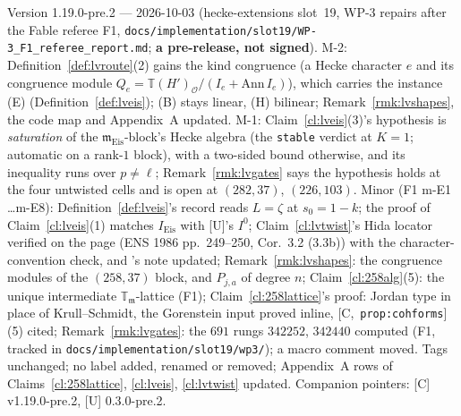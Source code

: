 \documentclass[11pt]{article}
\theoremstyle{remark}
\newcommand{\T}{\mathbb{T}}
\newcommand{\m}{\mathfrak{m}}
\newcommand{\HA}[1]{[C,~\texttt{#1}]}      %
\begin{document}
Version 1.19.0-pre.2 --- 2026-10-03 (hecke-extensions slot~19, WP-3 repairs after the Fable referee F1, \texttt{docs/implementation/slot19/WP-3\_F1\_referee\_report.md};
\textbf{a pre-release, not signed}). M-2: Definition~\ref{def:lvroute}(2) gains the kind \textsf{congruence} (a Hecke character $e$ and its congruence module
$Q_e=\T(H')_{\mathcal O}/(I_e+\mathrm{Ann}\,I_e)$), which carries the instance (E) (Definition~\ref{def:lveis}); (B) stays \textsf{linear}, (H) \textsf{bilinear};
Remark~\ref{rmk:lvshapes}, the code map and Appendix~A updated. M-1: Claim~\ref{cl:lveis}(3)'s hypothesis is \emph{saturation} of the $\m_{\mathrm{Eis}}$-block's
Hecke algebra (the \texttt{stable} verdict at $K=1$; automatic on a rank-$1$ block), with a two-sided bound otherwise, and its inequality runs over $p\neq\ell$;
Remark~\ref{rmk:lvgates} says the hypothesis holds at the four untwisted cells and is open at $(282,37)$, $(226,103)$. Minor (F1 m-E1 \dots m-E8): Definition~\ref{def:lveis}'s
record reads $L=\zeta$ at $s_0=1-k$; the proof of Claim~\ref{cl:lveis}(1) matches $I_{\mathrm{Eis}}$ with [U]'s $I^{0}$; Claim~\ref{cl:lvtwist}'s Hida locator verified on the
page (ENS 1986 pp.~249--250, Cor.~3.2 (3.3b)) with the character-convention check, and \cite{hida_ens}'s note updated; Remark~\ref{rmk:lvshapes}: the congruence modules of
the $(258,37)$ block, and $P_{j,a}$ of degree $n$; Claim~\ref{cl:258alg}(5): the unique intermediate $\T_\m$-lattice (F1); Claim~\ref{cl:258lattice}'s proof: Jordan type in
place of Krull--Schmidt, the Gorenstein input proved inline, \HA{prop:cohforms}(5) cited; Remark~\ref{rmk:lvgates}: the $691$ rungs $342252$, $342440$ computed (F1, tracked
in \texttt{docs/implementation/slot19/wp3/}); a macro comment moved. Tags unchanged; no label added, renamed or removed; Appendix~A rows of
Claims~\ref{cl:258lattice}, \ref{cl:lveis}, \ref{cl:lvtwist} updated. Companion pointers: [C] v1.19.0-pre.2, [U] 0.3.0-pre.2.
\end{document}
